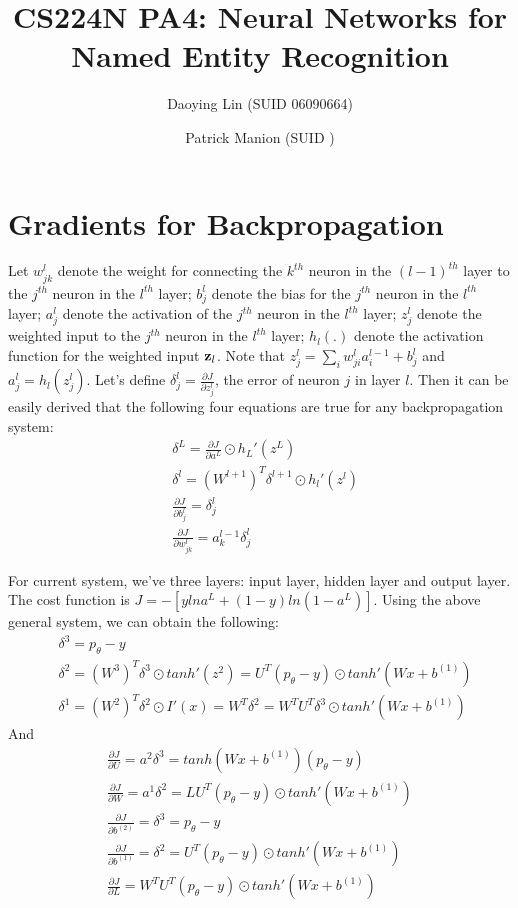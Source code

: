 \documentclass[11pt, oneside]{article}   	%
\title{CS224N PA4: Neural Networks for Named Entity Recognition}
\author{
	Daoying Lin (SUID 06090664)\\
	\and
	Patrick Manion (SUID )
}
\date{}							%
\begin{document}
\maketitle

\section{Gradients for Backpropagation}
Let $w_{jk}^l$ denote the weight for connecting the $k^{th}$ neuron in the $(l-1)^{th}$ layer to the $j^{th}$ neuron in the $l^{th}$ layer; $b_j^l$ denote the bias for the $j^{th}$ neuron in the $l^{th}$ layer; $a_j^l$ denote the activation of the $j^{th}$ neuron in the $l^{th}$ layer; $z_j^l$ denote the weighted input to the $j^{th}$ neuron in the $l^{th}$ layer; $h_l(.)$ denote the activation function for the weighted input $\bold{z}_l$.  Note that $z_j^l = \sum_{i} w_{ji}^l a_i^{l-1} + b_j^l$ and $a_j^l = h_l(z_j^l)$. Let's define $\delta_j^l = \frac{\partial J}{\partial z_j^l}$, the error of neuron $j$ in layer $l$. Then it can be easily derived that the following four equations are true for any backpropagation system:
\begin{subequations}
\begin{align}
& \delta^L = \frac{\partial J}{ \partial a^L} \odot h_L'(z^L) \\
& \delta^l  = (W^{l+1})^T \delta^{l+1} \odot h_l'(z^l) \\
& \frac{\partial J}{ \partial b_j^l}   = \delta_j^l \\
& \frac{\partial J}{\partial w^l_{jk}} = a_k^{l-1} \delta_j^l 
\end{align}
\end{subequations}

For current system, we've three layers: input layer, hidden layer and output layer. The cost function is $J = - [y lna^L + (1-y) ln(1- a^L)]$. Using the above general system, we can obtain the following:
\begin{subequations}
\begin{align}
& \delta^3 =  p_{\theta} - y\\
& \delta^2 = (W^3)^T \delta^3 \odot tanh'(z^2) = U^T (p_{\theta} - y)  \odot tanh'(Wx + b^{(1)}) \\
& \delta^1 = (W^2)^T \delta^2  \odot I'(x)= W^T \delta^2 = W^T U^T \delta^3 \odot tanh'(Wx + b^{(1)})
\end{align}
\end{subequations}
And
\begin{subequations}
\begin{align}
\frac{\partial J}{ \partial U} = a^2 \delta^3 = tanh(Wx + b^{(1)}) (p_{\theta} - y) \\
\frac{\partial J}{ \partial W} = a^1 \delta^2 = LU^T(p_{\theta} - y) \odot tanh'(Wx + b^{(1)}) \\
\frac{\partial J}{ \partial b^{(2)}} = \delta^3 = p_{\theta} - y \\
\frac{\partial J}{ \partial b^{(1)}} = \delta^2 = U^T(p_{\theta} - y) \odot tanh'(Wx + b^{(1)}) \\
\frac{\partial J}{ \partial L} = W^T U^T (p_{\theta} - y) \odot tanh'(Wx + b^{(1)})  
\end{align}
\end{subequations}
\end{document}
